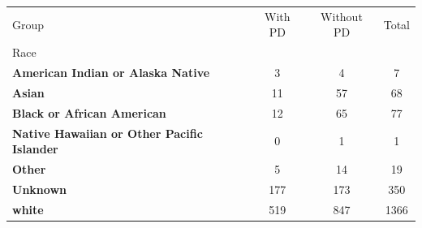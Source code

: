 \begin{table}
\label{tab:race_dist}
\begin{tabular}{lccc}
\toprule
Group & With PD & Without PD & Total \\
Race &  &  &  \\
\midrule
\textbf{American Indian or Alaska Native} & 3 & 4 & 7 \\
\textbf{Asian} & 11 & 57 & 68 \\
\textbf{Black or African American} & 12 & 65 & 77 \\
\textbf{Native Hawaiian or Other Pacific Islander} & 0 & 1 & 1 \\
\textbf{Other} & 5 & 14 & 19 \\
\textbf{Unknown} & 177 & 173 & 350 \\
\textbf{white} & 519 & 847 & 1366 \\
\bottomrule
\end{tabular}
\end{table}

